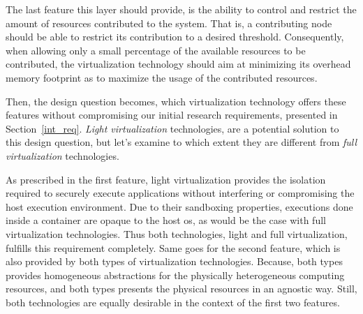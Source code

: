 \documentclass[12pt, titlepage]{uo_temp}
\begin{document}
     The last feature this layer should provide, is the ability to control and restrict
     the amount of resources contributed to the system. That is, a contributing node
     should be able to restrict its contribution to a desired threshold. Consequently, when
     allowing only a small percentage of the available resources to be contributed, the
     virtualization technology should aim at minimizing its overhead memory footprint as
     to maximize the usage of the contributed resources.

     Then, the design question becomes, which virtualization technology offers these
     features without compromising our initial research requirements, presented in
     Section~\ref{int_req}. \emph{Light virtualization} technologies, are a potential
     solution to this design question, but let's examine to which extent they are
     different from \emph{full virtualization} technologies.

     As prescribed in the first feature, light virtualization provides the isolation
     required to securely execute applications without interfering or compromising the
     host execution environment. Due to their sandboxing properties, executions done
     inside a container are opaque to the host \gls{os}, as would be the case with full
     virtualization technologies. Thus both technologies, light and full virtualization,
     fulfills this requirement completely. Same goes for the second feature, which is also
     provided by both types of virtualization technologies. Because, both types provides
     homogeneous abstractions for the physically heterogeneous computing resources, and
     both types presents the physical resources in an agnostic way. Still, both
     technologies are equally desirable in the context of the first two features.
\end{document}
